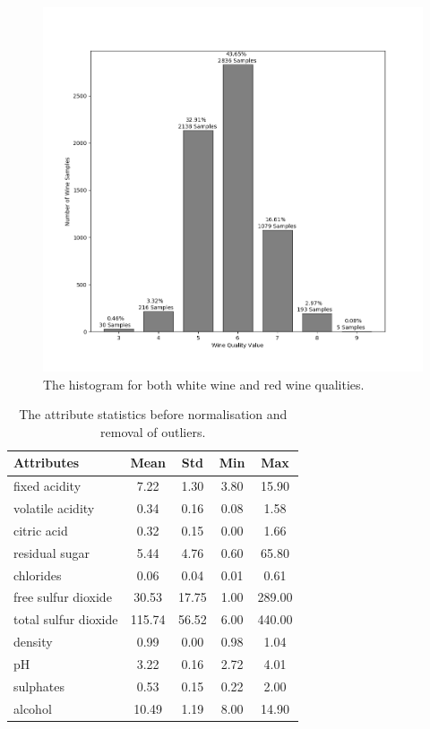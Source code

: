 \documentclass[10pt,twocolumn,letterpaper]{article}
\begin{document}
\begin{figure}[h]
	\begin{center}
		\includegraphics[width=0.9\linewidth]{img/samples.png}
	\end{center}
	\caption{The histogram for both white wine and red wine qualities.}
	\label{fig:hist}
\end{figure}


\begin{table}[h]
	\begin{center}
		\begin{tabular}{|l|c|c|c|c|}
			\hline
			Attributes & Mean & Std & Min & Max \\
			\hline
			fixed acidity & 7.22 & 1.30 & 3.80 & 15.90 \\
			volatile acidity & 0.34 & 0.16 & 0.08 & 1.58 \\
			citric acid & 0.32 & 0.15 & 0.00 & 1.66 \\
			residual sugar & 5.44 & 4.76 & 0.60 & 65.80 \\
			chlorides & 0.06 & 0.04 & 0.01 & 0.61 \\
			free sulfur dioxide & 30.53 & 17.75 & 1.00 & 289.00 \\
			total sulfur dioxide & 115.74 & 56.52 & 6.00 & 440.00 \\
			density & 0.99 & 0.00 & 0.98 & 1.04 \\
			pH & 3.22 & 0.16 & 2.72 & 4.01 \\
			sulphates & 0.53 & 0.15 & 0.22 & 2.00 \\
			alcohol & 10.49 & 1.19 & 8.00 & 14.90 \\ 
			\hline
		\end{tabular}
	\end{center}
	\caption{The attribute statistics before normalisation and removal of outliers.}
	\label{tab:attributes}
\end{table}
\end{document}
